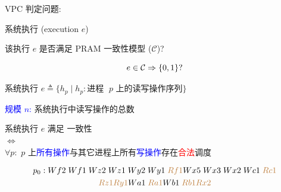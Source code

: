 \begin{frame}{}
  \begin{cdef}
    VPC 判定问题:

    \vspace{8pt}
    \begin{description}
      \setlength{\itemsep}{8pt}
      \item[实例:] 系统执行 {\small (execution $e$)}
      \item[问题:] 该执行 $e$ 是否满足 PRAM 一致性模型 {\small ($\mathcal{C}$)}? 
    \end{description}    

    \[
      e \in \mathcal{C} \Rightarrow \{0,1\}?
    \]
  \end{cdef}
\end{frame}

\begin{frame}{}
  \begin{cdef}[系统执行]
    系统执行 $e \triangleq \{h_p \mid h_p: \text{进程 } \;p \text{ 上的读写操作序列}\}$

    \vspace{0.30cm}
    \textcolor{blue}{规模 $n$:} 系统执行中读写操作的总数
  \end{cdef}

  \vspace{0.50cm}
\end{frame}

\begin{frame}{}
  \begin{cdef}
    \begin{center}
      系统执行 $e$ 满足 {\it \PRAM{}} 一致性 \\[5pt]
      $\iff$ \\[5pt]
      $\forall p:$ $p$ 上\textcolor{blue}{所有操作}与其它进程上所有\textcolor{blue}{写操作}存在\textcolor{red}{合法}调度
    \end{center}
  \end{cdef}

  \vspace{0.30cm}

  \pause
  \vspace{-0.80cm}

  \begin{gather*}
    p_{0}: Wf2\; Wf1\; Wz2\; Wz1\; Wy2\; Wy1\; \textcolor{brown}{Rf1} 
    Wx5\; Wx3\; Wx2\; Wc1\; \textcolor{brown}{Rc1} \\
    \textcolor{brown}{Rz1} \textcolor{brown}{Ry1}
    Wa1\; \textcolor{brown}{Ra1} Wb1\; \textcolor{brown}{Rb1} \textcolor{brown}{Rx2}
  \end{gather*}
\end{frame}

